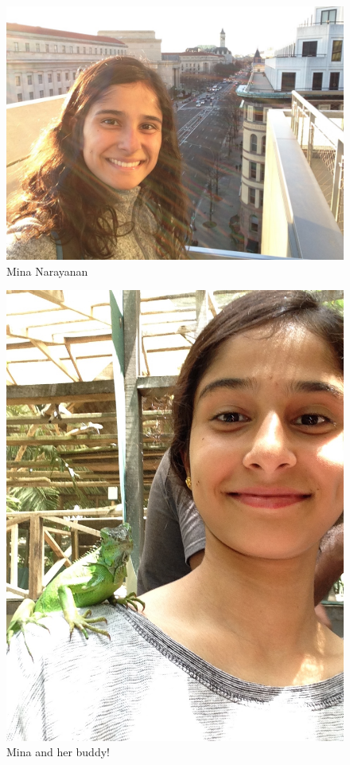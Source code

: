 \documentclass{article}
\begin{document}
\begin{figure}[b]
\centering
\includegraphics[scale=0.25]{Mina_N.png}
\caption{Mina Narayanan}
\label{fig:Mina_N}
\end{figure}

\begin{figure}[b]
\centering
\includegraphics[scale=0.25]{iguana.jpg}
\caption{Mina and her buddy!}
\label{fig:iguana}
\end{figure}
\end{document}
